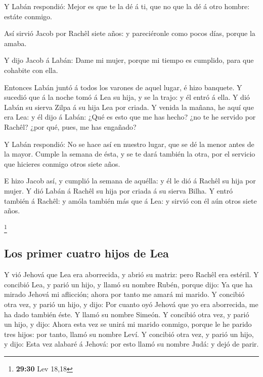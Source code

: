  Y Labán respondió: Mejor es que te la dé á ti, que no
que la dé á otro hombre: estáte conmigo.

 Así sirvió Jacob por Rachêl siete años: y pareciéronle
como pocos días, porque la amaba.

 Y dijo Jacob á Labán: Dame mi mujer, porque mi tiempo es
cumplido, para que cohabite con ella.

 Entonces Labán juntó á todos los varones de aquel lugar,
é hizo banquete.  Y sucedió que á la noche tomó á Lea su
hija, y se la trajo: y él entró á ella.  Y dió Labán su
sierva Zilpa á su hija Lea por criada.  Y venida la
mañana, he aquí que era Lea: y él dijo á Labán: ¿Qué es esto que me has
hecho? ¿no te he servido por Rachêl? ¿por qué, pues, me has engañado?

 Y Labán respondió: No se hace así en nuestro lugar, que
se dé la menor antes de la mayor.  Cumple la semana de
ésta, y se te dará también la otra, por el servicio que hicieres conmigo
otros siete años.

 E hizo Jacob así, y cumplió la semana de aquélla: y él
le dió á Rachêl su hija por mujer.  Y dió Labán á Rachêl
su hija por criada á su sierva Bilha.  Y entró también á
Rachêl: y amóla también más que á Lea: y sirvió con él aún otros siete
años.

\footnote{\textbf{29:30} Lev 18,18}

\hypertarget{los-primer-cuatro-hijos-de-lea}{%
\subsection{Los primer cuatro hijos de
Lea}\label{los-primer-cuatro-hijos-de-lea}}

 Y vió Jehová que Lea era aborrecida, y abrió su matriz:
pero Rachêl era estéril.  Y concibió Lea, y parió un
hijo, y llamó su nombre Rubén, porque dijo: Ya que ha mirado Jehová mi
aflicción; ahora por tanto me amará mi marido.  Y
concibió otra vez, y parió un hijo, y dijo: Por cuanto oyó Jehová que yo
era aborrecida, me ha dado también éste. Y llamó su nombre Simeón.
 Y concibió otra vez, y parió un hijo, y dijo: Ahora esta
vez se unirá mi marido conmigo, porque le he parido tres hijos: por
tanto, llamó su nombre Leví.  Y concibió otra vez, y
parió un hijo, y dijo: Esta vez alabaré á Jehová: por esto llamó su
nombre Judá: y dejó de parir.

